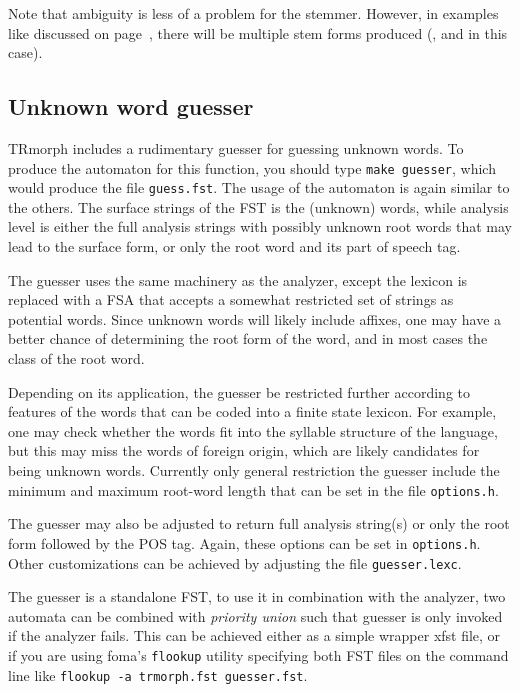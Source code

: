 \documentclass[twocolumn]{article}
\begin{document}
Note that ambiguity is less of a problem for the stemmer. However,
in examples like  discussed on page~\pageref{itm:buna},
there will be multiple stem forms produced (,  and
 in this case).

\subsection{Unknown word guesser}

TRmorph includes a rudimentary guesser for guessing unknown words. To
produce the automaton for this function, you should type
\lstinline{make guesser}, which would produce the file
\lstinline{guess.fst}. The usage of the automaton is again similar to
the others. The surface strings of the FST is the (unknown) words,
while analysis level is either the full analysis strings with possibly
unknown root words that may lead to the surface form, or only the root
word and its part of speech tag.

The guesser uses the same machinery as the analyzer, except the
lexicon is replaced with a FSA that accepts a somewhat restricted set
of strings as potential words. Since unknown words will likely include
affixes, one may have a better chance of determining the root form of
the word, and in most cases the class of the root word.

Depending on its application, the guesser be restricted further
according to features of the words that can be coded into a finite
state lexicon. For example, one may check whether the words fit into
the syllable structure of the language, but this may miss the words of
foreign origin, which are likely candidates for being unknown words.
Currently only general restriction the guesser include the minimum
and maximum root-word length that can be set in the file
\lstinline{options.h}.

The guesser may also be adjusted to
return full analysis string(s) or only the root form followed by the
POS tag. Again, these options can be set in \lstinline{options.h}.
Other customizations can be achieved by adjusting the file
\lstinline{guesser.lexc}.

The guesser is a standalone FST, to use it in combination with the
analyzer, two automata can be combined with \emph{priority union} such
that guesser is only invoked if the analyzer fails. This can be
achieved either as a simple wrapper xfst file, or if you are using
foma's \lstinline{flookup} utility specifying both FST files on the
command line like \lstinline{flookup -a trmorph.fst guesser.fst}.
\end{document}
